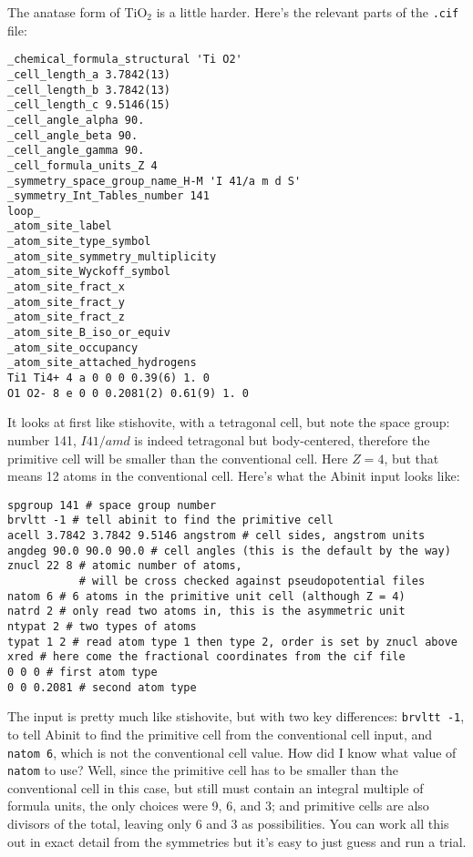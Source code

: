 \documentclass{article}
\begin{document}
The anatase form of TiO$_2$ is a little harder. Here's the relevant parts of the {\tt .cif} file:
\begin{verbatim}
_chemical_formula_structural 'Ti O2'
_cell_length_a 3.7842(13)
_cell_length_b 3.7842(13)
_cell_length_c 9.5146(15)
_cell_angle_alpha 90.
_cell_angle_beta 90.
_cell_angle_gamma 90.
_cell_formula_units_Z 4
_symmetry_space_group_name_H-M 'I 41/a m d S'
_symmetry_Int_Tables_number 141
loop_
_atom_site_label
_atom_site_type_symbol
_atom_site_symmetry_multiplicity
_atom_site_Wyckoff_symbol
_atom_site_fract_x
_atom_site_fract_y
_atom_site_fract_z
_atom_site_B_iso_or_equiv
_atom_site_occupancy
_atom_site_attached_hydrogens
Ti1 Ti4+ 4 a 0 0 0 0.39(6) 1. 0
O1 O2- 8 e 0 0 0.2081(2) 0.61(9) 1. 0
\end{verbatim}
It looks at first like stishovite, with a tetragonal cell, but note the space group:
number 141, $I 41/amd$ is indeed tetragonal but body-centered, therefore the primitive cell
will be smaller than the conventional cell. Here $Z = 4$, but that means 12 atoms in the conventional
cell. Here's what the {\sc Abinit} input looks like:
\begin{verbatim}
spgroup 141 # space group number
brvltt -1 # tell abinit to find the primitive cell
acell 3.7842 3.7842 9.5146 angstrom # cell sides, angstrom units
angdeg 90.0 90.0 90.0 # cell angles (this is the default by the way)
znucl 22 8 # atomic number of atoms,
           # will be cross checked against pseudopotential files
natom 6 # 6 atoms in the primitive unit cell (although Z = 4)
natrd 2 # only read two atoms in, this is the asymmetric unit
ntypat 2 # two types of atoms
typat 1 2 # read atom type 1 then type 2, order is set by znucl above
xred # here come the fractional coordinates from the cif file
0 0 0 # first atom type
0 0 0.2081 # second atom type
\end{verbatim}
The input is pretty much like stishovite, but with two key differences: {\tt brvltt -1}, to tell {\sc Abinit}
to find the primitive cell from the conventional cell input, and {\tt natom 6}, which is not the conventional
cell value. How did I know what value of {\tt natom} to use? Well, since the primitive cell has to be smaller than
the conventional cell in this case, but still must contain an integral multiple of formula units, the only
choices were 9, 6, and 3; and primitive cells are also divisors of the total, leaving only 6 and 3 as possibilities.
You can work all this out in exact detail from the symmetries but it's easy to just guess and run a trial.
\end{document}
